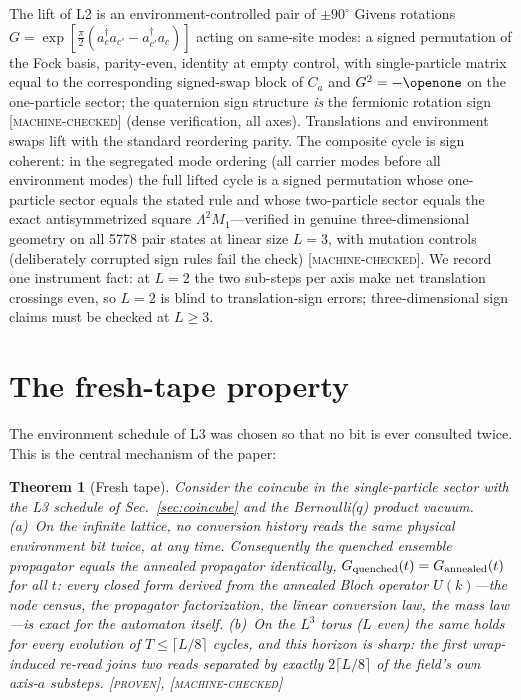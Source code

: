 \documentclass[aps,prd,twocolumn,superscriptaddress,nofootinbib,floatfix]{revtex4-2}
\newtheorem{theorem}{Theorem}
\newcommand{\evP}{\textnormal{\textsc{[proven]}}}
\newcommand{\evM}{\textnormal{\textsc{[machine-checked]}}}
\begin{document}
The lift of L2 is an environment-controlled pair of $\pm90^\circ$ Givens
rotations $G=\exp[\tfrac{\pi}{2}(a^\dagger_c a_{c'}-a^\dagger_{c'}a_c)]$
acting on same-site modes: a signed permutation of the Fock basis,
parity-even, identity at empty control, with single-particle matrix equal
to the corresponding signed-swap block of $C_a$ and $G^2=-\openone$ on the
one-particle sector; the quaternion sign structure \emph{is} the fermionic
rotation sign \evM{} (dense verification, all axes). Translations and
environment swaps lift with the standard reordering parity. The composite
cycle is sign coherent: in the segregated mode ordering (all carrier modes
before all environment modes) the full lifted cycle is a signed permutation
whose one-particle sector equals the stated rule and whose two-particle
sector equals the exact antisymmetrized square $\Lambda^2 M_1$---verified
in genuine three-dimensional geometry on all 5778 pair states at linear
size $L=3$, with mutation controls (deliberately corrupted sign rules fail
the check) \evM{}. We record one instrument fact: at $L=2$ the two
sub-steps per axis make net translation crossings even, so $L=2$ is blind
to translation-sign errors; three-dimensional sign claims must be checked
at $L\ge3$.

\section{The fresh-tape property}
\label{sec:freshtape}

The environment schedule of L3 was chosen so that no bit is ever
consulted twice. This is the central mechanism of the paper:

\begin{theorem}[Fresh tape]\label{thm:freshtape}
Consider the coincube in the single-particle sector with the L3 schedule
of Sec.~\ref{sec:coincube} and the Bernoulli($q$) product vacuum.
(a)~On the infinite lattice, no conversion history reads the same
physical environment bit twice, at any time. Consequently the quenched
ensemble propagator equals the annealed propagator \emph{identically},
$G_{\rm quenched}(t)=G_{\rm annealed}(t)$ for all $t$: every closed form
derived from the annealed Bloch operator $U(k)$---the node census, the
propagator factorization, the linear conversion law, the mass law---is
exact for the automaton itself. (b)~On the $L^3$ torus ($L$ even) the
same holds for every evolution of $T\le\lceil L/8\rceil$ cycles, and
this horizon is sharp: the first wrap-induced re-read joins two reads
separated by exactly $2\lceil L/8\rceil$ of the field's own axis-$a$
substeps. \evP{}, \evM{}
\end{theorem}
\end{document}
